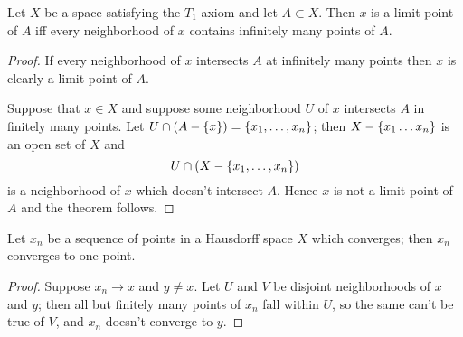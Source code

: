 \documentclass[10pt]{report}
\begin{document}
\begin{theorem}
  Let $X$ be a space satisfying the $T_1$ axiom and let $A \subset X$.
  Then $x$ is a limit point of $A$ iff every neighborhood of $x$ contains infinitely many points of $A$.
\end{theorem}
\begin{proof}
  If every neighborhood of $x$ intersects $A$ at infinitely many points then $x$ is clearly a limit point of $A$.

  Suppose that $x \in X$ and suppose some neighborhood $U$ of $x$ intersects $A$ in finitely many points.
  Let $U \cap (A - \{x\}) = \left\{ x_1,\dots,x_n \right\}$;
  then $X - \left\{ x_1 \dots x_n \right\}$ is an open set of $X$ and
  \[ U \cap (X - \left\{ x_1,\dots,x_n \right\})\]
  is a neighborhood of $x$ which doesn't intersect $A$.
  Hence $x$ is not a limit point of $A$ and the theorem follows.
\end{proof}

\begin{theorem}
  Let $x_n$ be a sequence of points in a Hausdorff space $X$ which converges; then $x_n$ converges to one point.
\end{theorem}
\begin{proof}
  Suppose $x_n \rightarrow x$ and $y \neq x$.
  Let $U$ and $V$ be disjoint neighborhoods of $x$ and $y$; then all but finitely many points of $x_n$ fall within $U$, so the same can't be true of $V$, and $x_n$ doesn't converge to $y$.
\end{proof}
\end{document}
